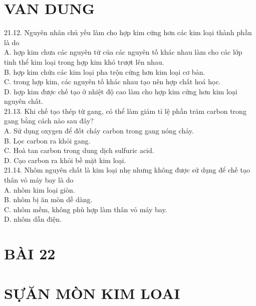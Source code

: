 \documentclass[10pt]{article}
\begin{document}
\section*{VAN DUNG}
21.12. Nguyên nhân chủ yếu làm cho hợp kim cứng hơn các kim loại thành phần là do\\
A. hợp kim chưa các nguyên tử của các nguyên tố khác nhau làm cho các lớp tinh thể kim loại trong hợp kim khó trượt lên nhau.\\
B. hợp kim chứa các kim loại pha trộn cứng hơn kim loại cơ bản.\\
C. trong hợp kim, các nguyên tố khác nhau tạo nên hợp chất hoá học.\\
D. hợp kim được chế tạo ở nhiệt độ cao làm cho hợp kim cứng hơn kim loại nguyên chất.\\
21.13. Khi chế tạo thép từ gang, có thể làm giảm tỉ lệ phần trăm carbon trong gang bằng cách nào sau đây?\\
A. Sử dụng oxygen để đốt cháy carbon trong gang nóng chảy.\\
B. Lọc carbon ra khỏi gang.\\
C. Hoà tan carbon trong dung dịch sulfuric acid.\\
D. Cạo carbon ra khỏi bề mặt kim loại.\\
21.14. Nhôm nguyên chất là kim loại nhẹ nhưng không được sử dụng để chế tạo thân vỏ máy bay là do\\
A. nhôm kim loại giòn.\\
B. nhôm bị ăn mòn dễ dàng.\\
C. nhôm mềm, không phù hợp làm thân vỏ máy bay.\\
D. nhôm dẫn điện.

\section*{BÀI 22}
\section*{SỰĂN MÒN KIM LOAI}
\end{document}
